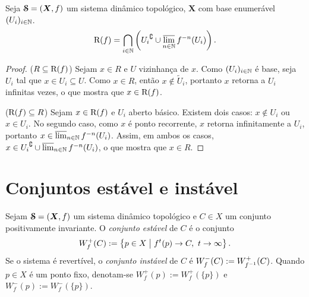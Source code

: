 \begin{proposition}
\label{prop:recorr}
Seja $\bm{\mathcal{S}}=(\bm X,f)$ um sistema dinâmico topológico, $\bm X$ com base enumerável $(U_i)_{i \in \mathbb{N}}$.
	\begin{equation*}
	\mathrm{R}(f) = \bigcap_{i \in \mathbb{N}} \left( {U_i}^\complement \cup \varlimsup_{n \in \mathbb{N}} f^{-n}(U_i) \right).
	\end{equation*}
\end{proposition}
\begin{proof}
($R \subseteq \mathrm{R}(f)$) Sejam $x \in R$ e $U$ vizinhança de $x$. Como $(U_i)_{i \in \mathbb{N}}$ é base, seja $U_i$ tal que $x \in U_i \subseteq U$. Como $x \in R$, então $x \notin \tilde U_i$, portanto $x$ retorna a $U_i$ infinitas vezes, o que mostra que $x \in \mathrm{R}(f)$.

($\mathrm{R}(f) \subseteq R$) Sejam $x \in \mathrm{R}(f)$ e $U_i$ aberto básico. Existem dois casos: $x \notin U_i$ ou $x \in U_i$. No segundo caso, como $x$ é ponto recorrente, $x$ retorna infinitamente a $U_i$, portanto $x \in \varlimsup_{n \in \mathbb{N}} f^{-n}(U_i)$. Assim, em ambos os casos, $x \in {U_i}^\complement \cup \varlimsup_{n \in \mathbb{N}} f^{-n}(U_i)$, o que mostra que $x \in R$.
\end{proof}

\section{Conjuntos estável e instável}


\begin{definition}
Sejam $\bm{\mathcal{S}}=(\bm X,f)$ um sistema dinâmico topológico e $C \in X$ um conjunto positivamente invariante.
O \emph{conjunto estável} de $C$ é o conjunto
	\begin{equation*}
	W^+_f(C) := \left\{{p \in X}\;\middle\vert\;{f^t(p) \rightarrow C,\ t \rightarrow \infty}\right\}.
	\end{equation*}
Se o sistema é revertível, o \emph{conjunto instável} de $C$ é $W^-_f(C) := W^+_{f^{-1}}(C)$.
Quando $p \in X$ é um ponto fixo, denotam-se $W^+_f(p) := W^+_f(\{p\})$ e $W^-_f(p) := W^-_f(\{p\})$.
\end{definition}

